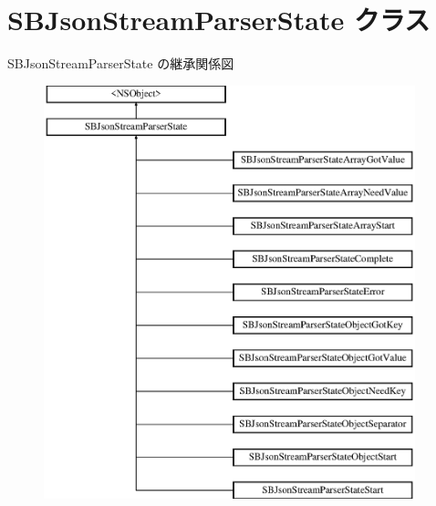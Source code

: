 \hypertarget{interface_s_b_json_stream_parser_state}{}\section{S\+B\+Json\+Stream\+Parser\+State クラス}
\label{interface_s_b_json_stream_parser_state}
S\+B\+Json\+Stream\+Parser\+State の継承関係図\begin{figure}[H]
\begin{center}
\leavevmode
\includegraphics[height=12.000000cm]{interface_s_b_json_stream_parser_state}
\end{center}
\end{figure}
